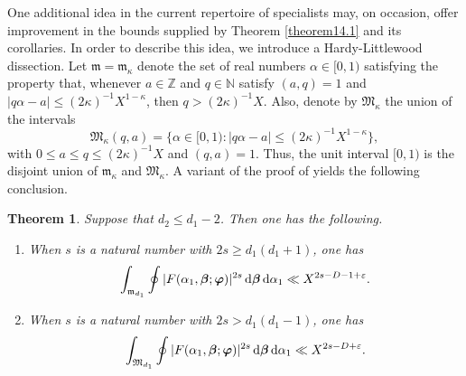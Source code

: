 \documentclass[12pt,reqno]{amsart}
\newtheorem{theorem}{Theorem}[section]
\theoremstyle{definition}
\theoremstyle{remark}
\numberwithin{equation}{section}
\def\dbN{{\mathbb N}} \def\dbO{{\mathbb O}} \def\dbP{{\mathbb P}}
\def\dbZ{{\mathbb Z}}\def\dbQ{{\mathbb Q}}
\def\grm{{\mathfrak m}}\def\grM{{\mathfrak M}}
\def\alp{{\alpha}} \def\bfalp{{\boldsymbol \alpha}}
\def\kap{{\kappa}}
\def\eps{\varepsilon}
\def\le{\leqslant} \def\ge{\geqslant} \def\pleq{\preccurlyeq} \def\ple{\prec}
\def\d{{\,{\rm d}}}
\begin{document}
One additional idea in the current repertoire of specialists may, on occasion, offer 
improvement in the bounds supplied by Theorem \ref{theorem14.1} and its corollaries. In 
order to describe this idea, we introduce a Hardy-Littlewood dissection. Let 
$\grm=\grm_\kap$ denote the set of real numbers $\alp\in [0,1)$ satisfying the property 
that, whenever $a\in \dbZ$ and $q\in \dbN$ satisfy $(a,q)=1$ and 
$|q\alp-a|\le (2\kap)^{-1}X^{1-\kap}$, then $q>(2\kap)^{-1}X$. Also, denote by 
$\grM_\kap$ the union of the intervals
$$\grM_\kap(q,a)=\{\alp\in [0,1):|q\alp-a|\le (2\kap)^{-1}X^{1-\kap}\},$$
with $0\le a\le q\le (2\kap)^{-1}X$ and $(q,a)=1$. Thus, the unit interval $[0,1)$ is the 
disjoint union of $\grm_\kap$ and $\grM_\kap$. A variant of the proof of 
\cite[Theorem 1.3]{Woo2012b} yields the following conclusion.

\begin{theorem}\label{theorem14.4} Suppose that $d_2\le d_1-2$. Then one has the 
following.
\begin{enumerate}
\item[(i)] When $s$ is a natural number with $2s\ge d_1(d_1+1)$, one has
$$\int_{\grm_{d_1}}\oint |F(\alp_1,\bfbet;\bfvarphi)|^{2s}\d\bfbet \d\alp_1 \ll 
X^{2s-D-1+\eps}.$$
\item[(ii)] When $s$ is a natural number with $2s>d_1(d_1-1)$, one has
$$\int_{\grM_{d_1}}\oint |F(\alp_1,\bfbet;\bfvarphi)|^{2s}\d\bfbet \d\alp_1 \ll 
X^{2s-D+\eps}.$$
\end{enumerate}
\end{theorem}
\end{document}

